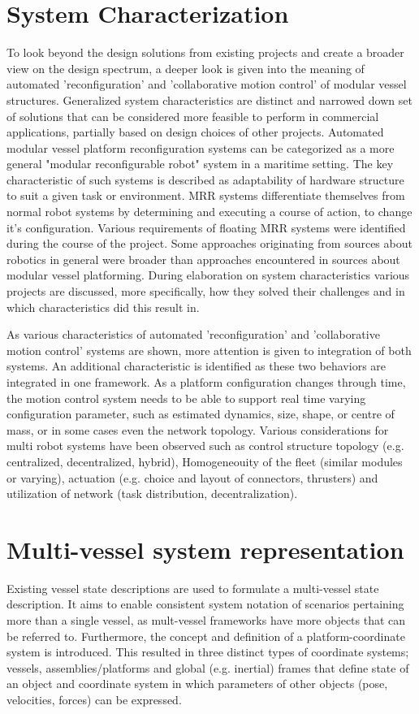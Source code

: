 \section*{System Characterization}
To look beyond the design solutions from existing projects and create a broader view on the design spectrum, a deeper look is given into the meaning of automated 'reconfiguration' and 'collaborative motion control' of modular vessel structures. Generalized system characteristics are distinct and narrowed down set of solutions that can be considered more feasible to perform in commercial applications, partially based on design choices of other projects.  Automated modular vessel platform reconfiguration systems can be categorized as a more general "modular reconfigurable robot" system in a maritime setting. The key characteristic of such systems is described as adaptability of hardware structure to suit a given task or environment. MRR systems differentiate themselves from normal robot systems by determining and executing a course of action, to change it's configuration. Various requirements of floating MRR systems were identified during the course of the project. Some approaches originating from sources about robotics in general were broader than approaches encountered in sources about modular vessel platforming. During elaboration on system characteristics various projects are discussed, more specifically, how they solved their challenges and in which characteristics did this result in.

As various characteristics of automated 'reconfiguration' and 'collaborative motion control' systems are shown, more attention is given to integration of both systems. An additional characteristic is identified as these two behaviors are integrated in one framework. As a platform configuration changes through time, the motion control system needs to be able to support real time varying configuration parameter, such as estimated dynamics, size, shape, or centre of mass, or in some cases even the network topology. Various considerations for multi robot systems have been observed such as control structure topology (e.g. centralized, decentralized, hybrid), Homogeneouity of the fleet (similar modules or varying), actuation (e.g. choice and layout of connectors, thrusters) and utilization of network (task distribution, decentralization).

\section*{Multi-vessel system representation}
Existing vessel state descriptions are used to formulate a multi-vessel state description. It aims to enable consistent system notation of scenarios pertaining more than a single vessel, as mult-vessel frameworks have more objects that can be referred to. Furthermore, the concept and definition of a platform-coordinate system is  introduced. This resulted in three distinct types of coordinate systems; vessels, assemblies/platforms and global (e.g. inertial) frames that define state of an object and coordinate system in which parameters of other objects (pose, velocities, forces) can be expressed. 

